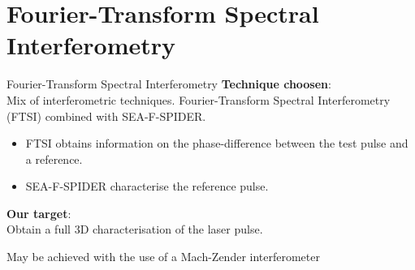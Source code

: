 \documentclass[11pt]{beamer}
\begin{document}
\section{Fourier-Transform Spectral Interferometry}
\begin{frame}{Fourier-Transform Spectral Interferometry}
\textbf{Technique choosen}:\\
Mix of interferometric techniques.
Fourier-Transform Spectral Interferometry (FTSI) combined with SEA-F-SPIDER.\\
\begin{itemize}
	\item FTSI obtains information on the phase-difference between the test pulse and a reference.\\
	\item SEA-F-SPIDER characterise the reference pulse.
\end{itemize}

\vspace{15pt}
\textbf{Our target}:\\
Obtain a full 3D characterisation of the laser pulse.

\vspace{10pt}
May be achieved with the use of a Mach-Zender interferometer
\end{frame}

%
%
\end{document}
